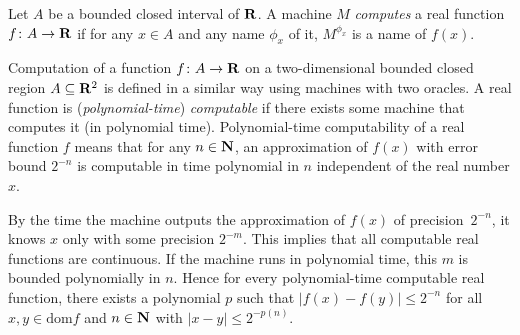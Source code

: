 \begin{definition}
Let $A$ be a bounded closed interval of\/ $\mathbf R$.
A machine $M$ \emph{computes} a real function $f \colon A \to \mathbf R$ 
if for any $x \in A$ and any name $\phi_x$ of it,
$M^{\phi_x}$ is a name of $f(x)$.
\end{definition}

Computation of a function $f \colon A \to \mathbf R$ on
a two-dimensional bounded closed region $A \subseteq \mathbf R ^2$ 
is defined in a similar way using machines with two oracles.
A real function is (\emph{polynomial-time}) \emph{computable} if there exists some machine that computes it (in polynomial time).
Polynomial-time computability of a real function $f$ means that
for any $n \in \mathbf N$, 
an approximation of $f(x)$ with error bound $2^{-n}$
is computable in time polynomial in $n$ 
independent of the real number $x$.

By the time the machine outputs the approximation of $f (x)$ of precision~$2 ^{-n}$, 
it knows $x$ only with some precision $2 ^{-m}$.
This implies that all computable real functions are continuous.
If the machine runs in polynomial time,
this $m$ is bounded polynomially in $n$.
Hence for every polynomial-time computable real function,
there exists a polynomial $p$ such that 
$|f(x) - f(y)| \le 2^{-n}$ for all $x, y \in \mathrm{dom} f$ and $n \in \mathbf N$
with $|x - y| \le 2^{-p(n)}$.

%

